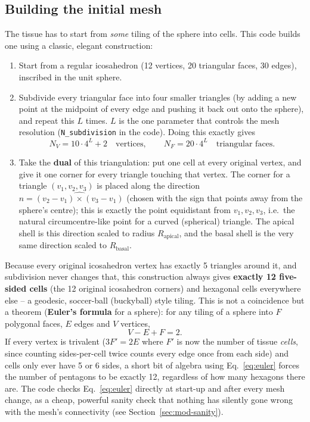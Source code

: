 \documentclass[11pt,a4paper]{report}
\begin{document}
\subsection{Building the initial mesh}
\label{sec:mesh-build}

The tissue has to start from \emph{some} tiling of the sphere into
cells. This code builds one using a classic, elegant construction:

\begin{enumerate}
  \item Start from a regular icosahedron (12 vertices, 20 triangular
  faces, 30 edges), inscribed in the unit sphere.
  \item Subdivide every triangular face into four smaller triangles
  (by adding a new point at the midpoint of every edge and pushing it
  back out onto the sphere), and repeat this $L$ times. $L$ is the one
  parameter that controls the mesh resolution (\texttt{N\_subdivision}
  in the code). Doing this exactly gives
  \[
    N_V = 10\cdot 4^{L}+2 \quad\text{vertices}, \qquad
    N_F = 20\cdot 4^{L} \quad\text{triangular faces}.
  \]
  \item Take the \textbf{dual} of this triangulation: put one cell at
  every original vertex, and give it one corner for every triangle
  touching that vertex. The corner for a triangle $(v_1,v_2,v_3)$ is
  placed along the direction $\hat{n}=\widehat{(v_2-v_1)\times(v_3-v_1)}$
  (chosen with the sign that points away from the sphere's centre);
  this is exactly the point equidistant from $v_1,v_2,v_3$, i.e.\ the
  natural circumcentre-like point for a curved (spherical) triangle. The
  apical shell is this direction scaled to radius $R_{\mathrm{apical}}$,
  and the basal shell is the very same direction scaled to
  $R_{\mathrm{basal}}$.
\end{enumerate}

Because every original icosahedron vertex has exactly 5 triangles
around it, and subdivision never changes that, this construction always
gives \textbf{exactly 12 five-sided cells} (the 12 original icosahedron
corners) and hexagonal cells everywhere else -- a geodesic, soccer-ball
(buckyball) style tiling. This is not a coincidence but a theorem
(\textbf{Euler's formula} for a sphere): for any tiling of a sphere into
$F$ polygonal faces, $E$ edges and $V$ vertices,
\begin{equation}
  V - E + F = 2 .
  \label{eq:euler}
\end{equation}
If every vertex is trivalent ($3F' = 2E$ where $F'$ is now the number of
tissue \emph{cells}, since counting sides-per-cell twice counts every
edge once from each side) and cells only ever have 5 or 6 sides, a short
bit of algebra using Eq.~\eqref{eq:euler} forces the number of
pentagons to be exactly 12, regardless of how many hexagons there are.
The code checks Eq.~\eqref{eq:euler} directly at start-up and after
every mesh change, as a cheap, powerful sanity check that nothing has
silently gone wrong with the mesh's connectivity (see
Section~\ref{sec:mod-sanity}).
\end{document}
